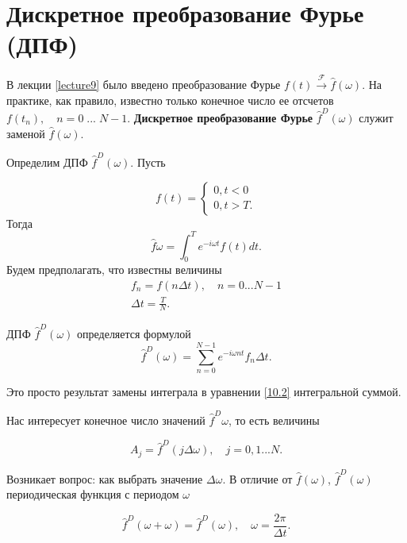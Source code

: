 \section{Дискретное преобразование Фурье (ДПФ)}
\label{lecture10}

В лекции \ref{lecture9} было введено преобразование Фурье $f(t) \xrightarrow{\mathscr{F}} \hat{f}(\omega)$. На практике, как правило, известно только конечное число ее отсчетов $f(t_n),\quad n = 0 \; ...\;N-1$. \textbf{Дискретное преобразование Фурье} $\hat{f}^D(\omega)$ служит заменой $\hat{f}(\omega)$.

Определим ДПФ $\hat{f}^D(\omega)$. Пусть

\begin{equation}\label{10.1}
f(t) = 
\begin{cases}
0, t < 0 \\
0, t > T.
\end{cases}
\end{equation}
Тогда
\begin{equation}\label{10.2}
\hat{f}\omega = \int_{0}^{T}e^{-i\omega t}f(t)dt.
\end{equation}
Будем предполагать, что известны величины
\begin{equation}\label{10.3}
\begin{gathered}
f_n = f(n \Delta t), \quad n = 0 ... N-1 \\
\Delta t = \frac{T}{N}.
\end{gathered}
\end{equation}

ДПФ $\hat{f}^D(\omega)$ определяется формулой
\begin{equation}\label{10.4}
\hat{f}^D(\omega) = \sum_{n = 0}^{N - 1} e^{-i \omega nt}f_n\Delta t.
\end{equation}

Это просто результат замены интеграла в уравнении \ref{10.2} интегральной суммой.

Нас интересует конечное число значений $\hat{f}^D\omega$, то есть величины 

\begin{equation}\label{10.5}
A_j = \hat{f}^D(j \Delta \omega), \quad j = 0, 1 ... N.
\end{equation}

Возникает вопрос: как выбрать значение $\Delta \omega$.
В отличие от $ \hat{f}(\omega)$, $\hat{f}^D(\omega)$ периодическая функция с периодом $\omega$

\begin{equation}\label{10.6}
\hat{f}^D(\omega + \omega) = \hat{f}^D(\omega), \quad \omega = \frac{2\pi}{\Delta t}.
\end{equation}

